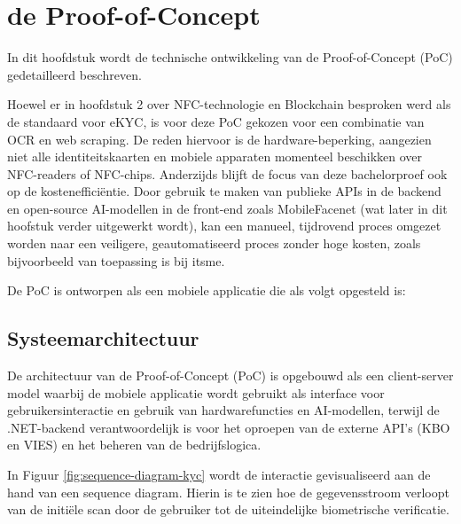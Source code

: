 
\chapter{de Proof-of-Concept}
\label{ch:proof-of-concept}
In dit hoofdstuk wordt de technische ontwikkeling van de Proof-of-Concept (PoC) gedetailleerd beschreven. 

Hoewel er in hoofdstuk 2 over NFC-technologie en Blockchain besproken werd als de standaard voor eKYC, is voor deze PoC gekozen voor
een combinatie van OCR en web scraping. De reden hiervoor is de hardware-beperking, aangezien niet alle identiteitskaarten en mobiele apparaten momenteel
beschikken over NFC-readers of NFC-chips. Anderzijds blijft de focus van deze bachelorproef ook op de kostenefficiëntie.
Door gebruik te maken van publieke APIs in de backend en open-source AI-modellen in de front-end zoals MobileFacenet (wat later in dit hoofstuk verder uitgewerkt wordt), kan een manueel, tijdrovend proces omgezet worden
naar een veiligere, geautomatiseerd proces zonder hoge kosten, zoals bijvoorbeeld van toepassing is bij itsme.

\medskip

De PoC is ontworpen als een mobiele applicatie die als volgt opgesteld is:

\section{Systeemarchitectuur}
De architectuur van de Proof-of-Concept (PoC) is opgebouwd als een client-server model waarbij de mobiele applicatie wordt gebruikt als interface voor
gebruikersinteractie en gebruik van hardwarefuncties en AI-modellen, terwijl de .NET-backend verantwoordelijk is voor het oproepen van de externe API's (KBO en VIES) en het beheren van de bedrijfslogica.

\medskip

In Figuur \ref{fig:sequence-diagram-kyc} wordt de interactie gevisualiseerd aan de hand van een sequence diagram. Hierin is te zien hoe de gegevensstroom verloopt van de initiële scan door de gebruiker tot de uiteindelijke biometrische verificatie.

